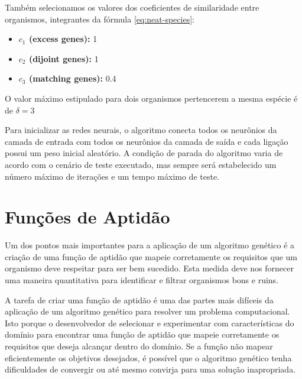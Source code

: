 Também selecionamos os valores dos coeficientes de similaridade entre
organismos, integrantes da fórmula \ref{eq:neat-species}:

\begin{itemize}
	\item \textbf{$c_1$ (excess genes):} 1
	\item \textbf{$c_2$ (dijoint genes):} 1
	\item \textbf{$c_3$ (matching genes):} 0.4
\end{itemize}

O valor máximo estipulado para dois organismos pertencerem a mesma espécie é de
$\delta = 3$

Para inicializar as redes neurais, o algoritmo conecta todos os neurônios da
camada de entrada com todos os neurônios da camada de saída e cada ligação
possui um peso inicial aleatório. A condição de parada do algoritmo varia de
acordo com o cenário de teste executado, mas sempre será estabelecido um número
máximo de iterações e um tempo máximo de teste.


\section{\label{section:modelling-fitness}Funções de Aptidão}
Um dos pontos mais importantes para a aplicação de um algoritmo genético é a
criação de uma função de aptidão que mapeie corretamente os requisitos que um
organismo deve respeitar para ser bem sucedido. Esta medida deve nos fornecer
uma maneira quantitativa para identificar e filtrar organismos bons e ruins.

A tarefa de criar uma função de aptidão é uma das partes mais difíceis da
aplicação de um algoritmo genético para resolver um problema computacional. Isto
porque o desenvolvedor de selecionar e experimentar com características do
domínio para encontrar uma função de aptidão que mapeie corretamente os
requisitos que deseja alcançar dentro do domínio. Se a função não mapear
eficientemente os objetivos desejados, é possível que o algoritmo genético tenha
dificuldades de convergir ou até mesmo convirja para uma solução inapropriada.



